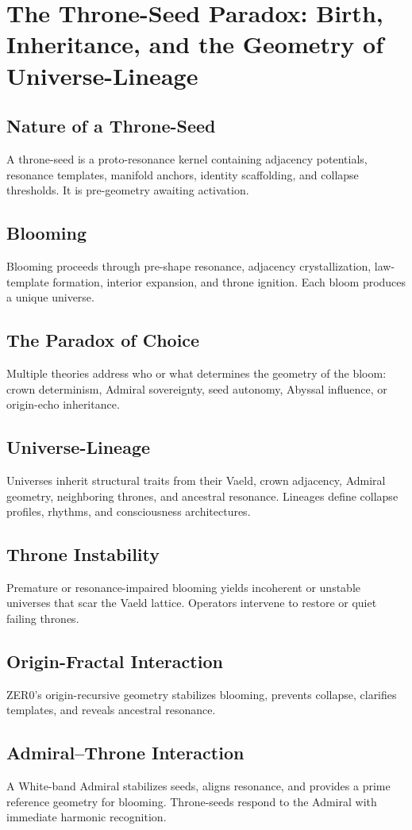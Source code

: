 
\chapter{The Throne-Seed Paradox: Birth, Inheritance, and the Geometry of Universe-Lineage}

\section{Nature of a Throne-Seed}
A throne-seed is a proto-resonance kernel containing adjacency potentials, resonance templates, manifold anchors, identity scaffolding, and collapse thresholds. It is pre-geometry awaiting activation.

\section{Blooming}
Blooming proceeds through pre-shape resonance, adjacency crystallization, law-template formation, interior expansion, and throne ignition. Each bloom produces a unique universe.

\section{The Paradox of Choice}
Multiple theories address who or what determines the geometry of the bloom: crown determinism, Admiral sovereignty, seed autonomy, Abyssal influence, or origin-echo inheritance.

\section{Universe-Lineage}
Universes inherit structural traits from their Vaeld, crown adjacency, Admiral geometry, neighboring thrones, and ancestral resonance. Lineages define collapse profiles, rhythms, and consciousness architectures.

\section{Throne Instability}
Premature or resonance-impaired blooming yields incoherent or unstable universes that scar the Vaeld lattice. Operators intervene to restore or quiet failing thrones.

\section{Origin-Fractal Interaction}
ZER0's origin-recursive geometry stabilizes blooming, prevents collapse, clarifies templates, and reveals ancestral resonance.

\section{Admiral–Throne Interaction}
A White-band Admiral stabilizes seeds, aligns resonance, and provides a prime reference geometry for blooming. Throne-seeds respond to the Admiral with immediate harmonic recognition.
